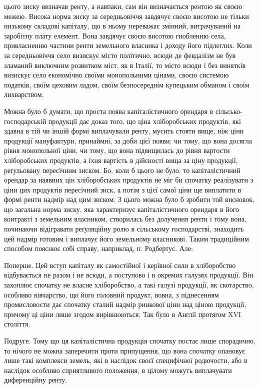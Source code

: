 \parcont{}  %
цього зиску визначав ренту, а навпаки, сам він визначається рентою як своєю
межею. Висока норма зиску за середньовіччя завдячує своєю висотою не тільки
низькому складові капіталу, що в ньому переважає змінний, витрачуваний на
заробітну плату елемент. Вона завдячує своєю висотою гнобленню села, привласненню
частини ренти земельного власника і доходу його підлеглих. Коли за
середньовіччя село визискує місто політично, всюди де февдалізм не був зламаний
виключним розвитком міст, як в Італії, то місто всюди і без винятків
визискує село економічно своїми монопольними цінами, своєю системою податків,
своїм цеховим ладом, своїм безпосереднім купецьким обманом і своїм
лихварством.

Можна було б думати, що проста поява капіталістичного орендаря в сільсько-господарській
продукції дає доказ того, що ціна хліборобських продуктів,
які здавна в тій чи іншій формі виплачували ренту, мусить стояти вище, ніж
ціни продукції мануфактури, принаймні, за доби цієї появи; чи тому, що
вона досягла рівня монопольної ціни, чи тому, що вона підвищилась до
рівня вартости хліборобських продуктів, а їхня вартість в дійсності вища за
ціну продукції, реґульовану пересічним зиском. Бо, коли б цього не було, то
капіталістичний орендар за наявних цін хліборобських продуктів не міг би
спочатку реалізувати з ціни цих продуктів пересічний зиск, а потім з цієї
самої ціни ще виплатити в формі ренти надмір над цим зиском. З цього можна
було б зробити той висновок, що загальна норма зиску, яка характеризує капіталістичного
орендаря в його контракті з земельним власником, створилась без
долучення ренти і тому вона, починаючи відігравати реґуляційну ролю в сільському
господарстві, знаходить цей надмір готовим і виплачує його земельному
власникові. Таким традиційним способом пояснює собі справу, наприклад,
п. Родбертус. Але:

Поперше. Цей вступ капіталу як самостійної і керівної сили в хліборобство
відбувається не разом і не всюди, а поступово і в окремих галузях продукції.
Він захоплює спочатку не власне хліборобство, а такі галузі продукції,
як скотарство, особливо вівчарство, що його головний продукт, вовна, з піднесенням
промисловости дає спочатку сталий надмір ринкової ціни над ціною
продукції, причому ці ціни лише згодом вирівнюються. Так було в Англії протягом
XVI століття.

Подруге. Тому що ця капіталістична продукція спочатку постає лише
спорадично, то нічого не можна заперечити проти припущення, що вона спочатку
опановує лише такі комплекси земель, які в наслідок своєї специфічної
родючости, або в наслідок особливо сприятливого положення, в цілому можуть
виплачувати диференційну ренту.

